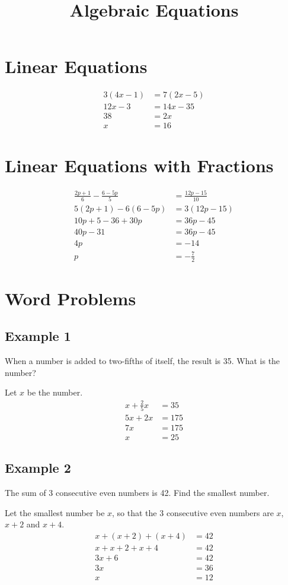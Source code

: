\documentclass[a4paper,12pt]{article}
\title{Algebraic Equations}
\date{}
\author{}
\begin{document}
\maketitle

\section{Linear Equations}
\[\begin{aligned}
    3(4x-1)&=7(2x-5)\\
    12x-3&=14x-35\\
    38&=2x\\
    x&=\boxed{16}
\end{aligned}\]

\section{Linear Equations with Fractions}
\[\begin{aligned}
    \frac{2p+1}6-\frac{6-5p}{5}&=\frac{12p-15}{10}\\
    5(2p+1)-6(6-5p)&=3(12p-15)\\
    10p+5-36+30p&=36p-45\\
    40p-31&=36p-45\\
    4p&=-14\\
    p&=\boxed{-\frac72}
\end{aligned}\]

\section{Word Problems}
\subsection{Example 1}
When a number is added to two-fifths of itself, the result is 35. What is the number?

Let \(x\) be the number.
\[\begin{aligned}
    x+\frac25x&=35\\
    5x+2x&=175\\
    7x&=175\\
    x&=\boxed{25}
\end{aligned}\]
\subsection{Example 2}
The sum of 3 consecutive even numbers is 42. Find the smallest number.

Let the smallest number be \(x\), so that the 3 consecutive even numbers are \(x\), \(x+2\) and \(x+4\).
\[\begin{aligned}
    x+(x+2)+(x+4)&=42\\
    x+x+2+x+4&=42\\
    3x+6&=42\\
    3x&=36\\
    x&=\boxed{12}
\end{aligned}\]
\end{document}
